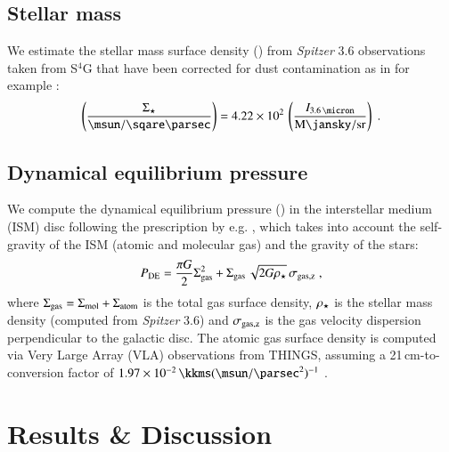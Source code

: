 \documentclass[letter, longauth]{aa} %
\begin{document}
\subsection{Stellar mass}
\label{sec:data:mstar}
We estimate the stellar mass surface density (\sigstar) from \textit{Spitzer} \SI{3.6}{\micron} observations taken from S$^4$G \citep{Sheth2010} that have been corrected for dust contamination \citep{Querejeta2015} as in for example \citet{Gallagher2018a, Jimenez-Donaire2019}:
\begin{align}
    \left(\dfrac{\sigstar}{\SI{}{\msun\per\sqare\parsec}}\right) = \num{4.22e2} \, \left(\dfrac{I_{\SI{3.6}{\micron}}}{\SI{}{\mega\jansky\per\steradian}}\right) \;.
\end{align}



\subsection{Dynamical equilibrium pressure}
\label{sec:data:pde}
We compute the dynamical equilibrium pressure (\pde) in the interstellar medium (ISM) disc following the prescription by e.g. \citet{Gallagher2018a, Jimenez-Donaire2019}, which takes into account the self-gravity of the ISM (atomic and molecular gas) and the gravity of the stars:
\begin{align}
    P_{\text{DE}} = \dfrac{\pi G}{2}\Sigma_{\text{gas}}^2 + \Sigma_{\text{gas}} \, \sqrt{2G\rho_{\star}} \, \sigma_{\rm gas, z} \;,
\end{align}
where $\Sigma_{\text{gas}}=\Sigma_{\text{mol}} + \Sigma_{\text{atom}}$ is the total gas surface density, $\rho_{\star}$ is the stellar mass density (computed from \textit{Spitzer} \SI{3.6}{\micron}) and $\sigma_{\rm gas, z}$ is the gas velocity dispersion perpendicular to the galactic disc.
The atomic gas surface density is computed via Very Large Array (VLA) \hone observations from THINGS, assuming a 21\,cm-to-\hi conversion factor of $\SI{1.97e-2}{\kkms}(\SI{}{\msun\per\square\parsec})^{-1}$ \citep{Walter2008}.




\section{Results \& Discussion}
\label{sec:results}
\end{document}

